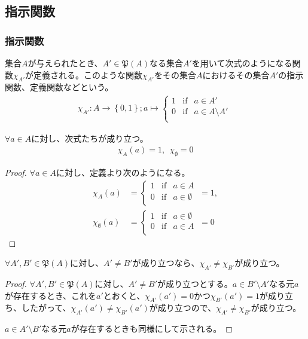 \documentclass[dvipdfmx]{jsarticle}
\begin{document}
\subsection{指示関数}
\subsubsection{指示関数}
\begin{dfn}
集合$A$が与えられたとき、$A'\in \mathfrak{P}(A)$なる集合$A'$を用いて次式のようになる関数$\chi_{A'}$が定義される。このような関数$\chi_{A'}$をその集合$A$におけるその集合$A'$の指示関数、定義関数などという。
\begin{align*}
\chi_{A'}:A \rightarrow \left\{ 0,1 \right\};a \mapsto \left\{ \begin{matrix}
1 & {\mathrm{if}} & a \in A' \\
0 & {\mathrm{if}} & a \in A \setminus A' \\
\end{matrix} \right.\ 
\end{align*}
\end{dfn}
\begin{thm}\label{1.2.5.1a}
$\forall a \in A$に対し、次式たちが成り立つ。
  \begin{align*}
  \chi_{A}(a) = 1, \ \ \chi_{\emptyset} = 0
  \end{align*}
\end{thm}
\begin{proof}
$\forall a \in A$に対し、定義より次のようになる。
  \begin{align*}
  \chi_{A}(a) &= \left\{ \begin{matrix}
  1 & {\mathrm{if}} & a \in A \\
  0 & {\mathrm{if}} & a \in \emptyset \\
  \end{matrix} \right.\  = 1, \\
  \chi_{\emptyset}(a) &= \left\{ \begin{matrix}
  1 & {\mathrm{if}} & a \in \emptyset \\
  0 & {\mathrm{if}} & a \in A \\
  \end{matrix} \right.\  = 0
  \end{align*}
\end{proof}
\begin{thm}\label{1.2.5.1b}
$\forall A',B'\in \mathfrak{P}(A)$に対し、$A' \neq B' $が成り立つなら、$\chi_{A'} \neq \chi_{B'}$が成り立つ。
\end{thm}
\begin{proof}
$\forall A',B'\in \mathfrak{P}(A)$に対し、$A' \neq B'$が成り立つとする。$a \in B' \setminus A'$なる元$a$が存在するとき、これを$a'$とおくと、$\chi_{A'}\left( a' \right) = 0 $かつ$\chi_{B'}\left( a' \right) = 1 $が成り立ち、したがって、$\chi_{A'}\left( a' \right) \neq \chi_{B'}\left( a' \right) $が成り立つので、$\chi_{A'} \neq \chi_{B'} $が成り立つ。\par 
$a \in A' \setminus B'$なる元$a$が存在するときも同様にして示される。
\end{proof}
\end{document}
